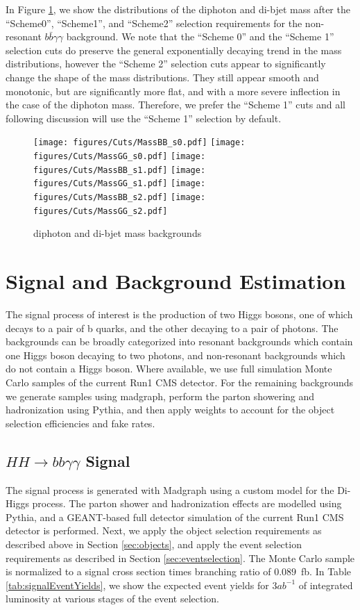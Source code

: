 \documentclass{cmspaper}
\begin{document}
In Figure \ref{fig:Mbb_Mgg}, we show the distributions of the diphoton and di-bjet mass after the 
``Scheme0'', ``Scheme1'', and ``Scheme2'' selection requirements for the non-resonant 
$b\bar{b}\gamma\gamma$ background. We note that the ``Scheme 0'' and the ``Scheme 1'' selection 
cuts do preserve the general exponentially decaying trend in the mass distributions, 
however the ``Scheme 2''  selection cuts appear to significantly change the shape of the 
mass distributions. They still appear smooth and monotonic, but are significantly more flat,
and with a more severe inflection in the case of the diphoton mass. Therefore, we prefer
the ``Scheme 1'' cuts and all following discussion will use the ``Scheme 1'' selection
by default. 

\begin{figure}[h]
\centering
\texttt{[image: figures/Cuts/MassBB\_s0.pdf]}	
\texttt{[image: figures/Cuts/MassGG\_s0.pdf]}	
\texttt{[image: figures/Cuts/MassBB\_s1.pdf]}	
\texttt{[image: figures/Cuts/MassGG\_s1.pdf]}	
\texttt{[image: figures/Cuts/MassBB\_s2.pdf]}	
\texttt{[image: figures/Cuts/MassGG\_s2.pdf]}	
\caption{diphoton and di-bjet mass backgrounds}
\label{fig:Mbb_Mgg}
\end{figure}



\section{Signal and Background Estimation}
\label{sec:bkgestimation}
The signal process of interest is the production of two Higgs bosons, one of which decays to a pair of b quarks, 
and the other decaying to a pair of photons. 
The backgrounds can be broadly categorized into resonant backgrounds which contain one Higgs boson 
decaying to two photons, and non-resonant backgrounds which do not contain a Higgs boson. 
Where available, we use full simulation Monte Carlo samples of the current Run1 CMS detector.
For the remaining backgrounds we generate samples using madgraph, perform the parton showering and
hadronization using Pythia, and then apply weights to account for the object selection efficiencies
and fake rates.

\subsection{$HH \rightarrow bb\gamma\gamma$ Signal}
The signal process is generated with Madgraph using a custom model for the Di-Higgs process. The parton
shower and hadronization effects are modelled using Pythia, and a GEANT-based full detector simulation 
of the current Run1 CMS detector is performed. Next, we apply the object selection requirements as 
described above in Section \ref{sec:objects}, and apply the event selection requirements as described 
in Section \ref{sec:eventselection}. The Monte Carlo sample is normalized to a signal cross section
times branching ratio of $0.089$~fb. In Table \ref{tab:signalEventYields}, we show the 
expected event yields for $3 ab^{-1}$ of integrated luminosity at various stages of the event
selection.
\end{document}
